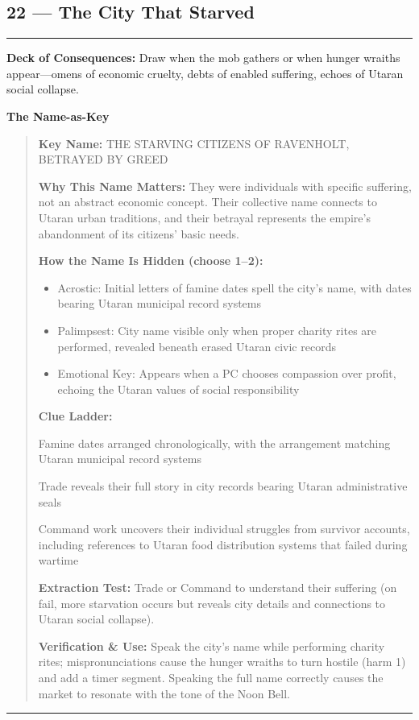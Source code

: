 \documentclass[18pt, letterpaper, twoside]{article}
\newenvironment{floorbox}[1]{%
    \begin{center}
    \begin{minipage}{0.95\textwidth}
    \subsection*{#1}
    \vspace{-0.5em}
    \rule{\textwidth}{0.5pt}
    \vspace{0.5em}
}{%
    \vspace{0.5em}
    \rule{\textwidth}{0.5pt}
    \end{minipage}
    \end{center}
}
\newenvironment{gmnote}[1]{%
    \vspace{0.5em}
    \noindent\textbf{#1}
    \begin{quote}
}{%
    \end{quote}
    \vspace{0.5em}
}
\newcommand{\deckdraw}[1]{\noindent\textbf{Deck of Consequences:} #1\par}
\newcommand{\keyname}[1]{\noindent\textbf{Key Name:} #1\par}
\newcommand{\nameimportance}[1]{\noindent\textbf{Why This Name Matters:} #1\par}
\begin{document}
\begin{floorbox}{22 --- The City That Starved}
\deckdraw{Draw when the mob gathers or when hunger wraiths appear---omens of economic cruelty, debts of enabled suffering, echoes of Utaran social collapse.}

\begin{gmnote}{The Name-as-Key}
\keyname{THE STARVING CITIZENS OF RAVENHOLT, BETRAYED BY GREED}
\nameimportance{They were individuals with specific suffering, not an abstract economic concept. Their collective name connects to Utaran urban traditions, and their betrayal represents the empire's abandonment of its citizens' basic needs.}

\textbf{How the Name Is Hidden (choose 1--2):}
\begin{itemize}[leftmargin=*]
    \item Acrostic: Initial letters of famine dates spell the city's name, with dates bearing Utaran municipal record systems
    \item Palimpsest: City name visible only when proper charity rites are performed, revealed beneath erased Utaran civic records
    \item Emotional Key: Appears when a PC chooses compassion over profit, echoing the Utaran values of social responsibility
\end{itemize}

\textbf{Clue Ladder:}
\begin{description}[leftmargin=*, style=unboxed]
    \item[Gentle Nudge:] Famine dates arranged chronologically, with the arrangement matching Utaran municipal record systems
    \item[Actionable Lead:] Trade reveals their full story in city records bearing Utaran administrative seals
    \item[Aha! Proof:] Command work uncovers their individual struggles from survivor accounts, including references to Utaran food distribution systems that failed during wartime
\end{description}

\textbf{Extraction Test:} Trade or Command to understand their suffering (on fail, more starvation occurs but reveals city details and connections to Utaran social collapse).

\textbf{Verification \& Use:} Speak the city's name while performing charity rites; mispronunciations cause the hunger wraiths to turn hostile (harm 1) and add a timer segment. Speaking the full name correctly causes the market to resonate with the tone of the Noon Bell.
\end{gmnote}


\end{floorbox}
\end{document}
